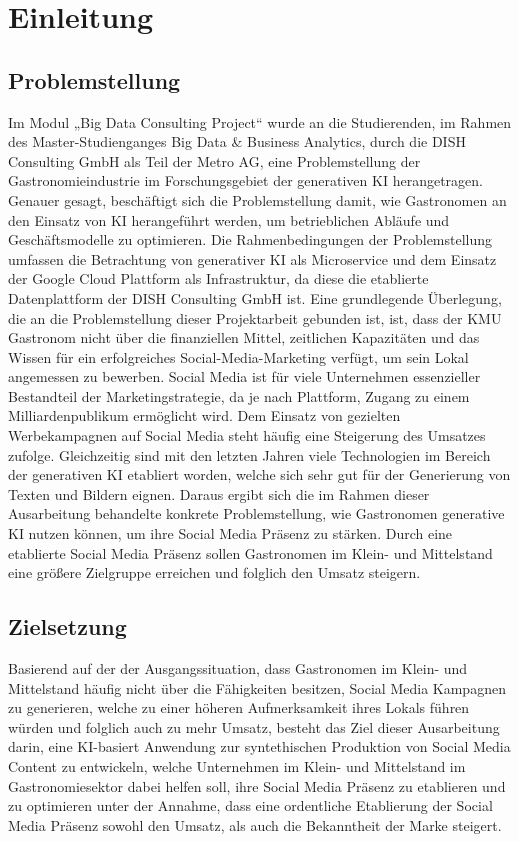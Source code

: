 \section{Einleitung}
\subsection{Problemstellung}
Im Modul „Big Data Consulting Project“ wurde an die Studierenden, im Rahmen des Master-Studienganges Big Data \& Business Analytics, durch die DISH Consulting GmbH als Teil der Metro AG, eine Problemstellung der Gastronomieindustrie im Forschungsgebiet der generativen \ac{KI} herangetragen.
Genauer gesagt, beschäftigt sich die Problemstellung damit, wie Gastronomen an den Einsatz von \ac{KI} herangeführt werden, um betrieblichen Abläufe und Geschäftsmodelle zu optimieren.
Die Rahmenbedingungen der Problemstellung umfassen die Betrachtung von generativer \ac{KI} als Microservice und dem Einsatz der Google Cloud Plattform als Infrastruktur, da diese die etablierte Datenplattform der DISH Consulting GmbH ist.
Eine grundlegende Überlegung, die an die Problemstellung dieser Projektarbeit gebunden ist, ist, dass der \ac{KMU} Gastronom nicht über die finanziellen Mittel, zeitlichen Kapazitäten und das Wissen für ein erfolgreiches Social-Media-Marketing verfügt, um sein Lokal angemessen zu bewerben.
Social Media ist für viele Unternehmen essenzieller Bestandteil der Marketingstrategie, da je nach Plattform, Zugang zu einem Milliardenpublikum ermöglicht wird.
Dem Einsatz von gezielten Werbekampagnen auf Social Media steht häufig eine Steigerung des Umsatzes zufolge.
Gleichzeitig sind mit den letzten Jahren viele Technologien im Bereich der generativen \ac{KI} etabliert worden, welche sich sehr gut für der Generierung von Texten und Bildern eignen.
Daraus ergibt sich die im Rahmen dieser Ausarbeitung behandelte konkrete Problemstellung, wie Gastronomen generative \ac{KI} nutzen können, um ihre Social Media Präsenz zu stärken.
Durch eine etablierte Social Media Präsenz sollen Gastronomen im Klein- und Mittelstand eine größere Zielgruppe erreichen und folglich den Umsatz steigern.
\subsection{Zielsetzung}
Basierend auf der der Ausgangssituation, dass Gastronomen im Klein- und Mittelstand häufig nicht über die Fähigkeiten besitzen, Social Media Kampagnen zu generieren, welche zu einer höheren Aufmerksamkeit ihres Lokals führen würden und folglich auch zu mehr Umsatz, besteht das Ziel dieser Ausarbeitung darin, eine KI-basiert Anwendung zur syntethischen Produktion von Social Media Content zu entwickeln, welche Unternehmen im Klein- und Mittelstand im Gastronomiesektor dabei helfen soll, ihre Social Media Präsenz zu etablieren und zu optimieren unter der Annahme, dass eine ordentliche Etablierung der Social Media Präsenz sowohl den Umsatz, als auch die Bekanntheit der Marke steigert.

